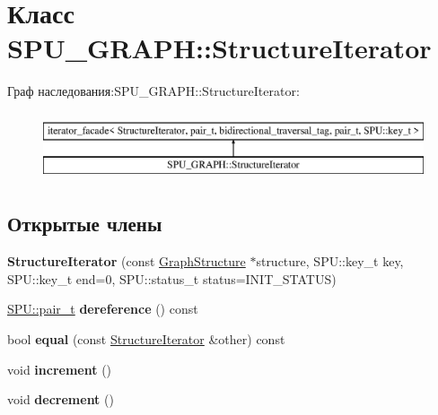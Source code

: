\hypertarget{class_s_p_u___g_r_a_p_h_1_1_structure_iterator}{}\section{Класс S\+P\+U\+\_\+\+G\+R\+A\+PH\+:\+:Structure\+Iterator}
\label{class_s_p_u___g_r_a_p_h_1_1_structure_iterator}
Граф наследования\+:S\+P\+U\+\_\+\+G\+R\+A\+PH\+:\+:Structure\+Iterator\+:\begin{figure}[H]
\begin{center}
\leavevmode
\includegraphics[height=2.000000cm]{class_s_p_u___g_r_a_p_h_1_1_structure_iterator}
\end{center}
\end{figure}
\subsection*{Открытые члены}
\begin{DoxyCompactItemize}
\item 
\mbox{\label{class_s_p_u___g_r_a_p_h_1_1_structure_iterator_a673249f944f5f9a2eb48e2de9cbda41e}} 
{\bfseries Structure\+Iterator} (const \hyperlink{class_s_p_u___g_r_a_p_h_1_1_graph_structure}{Graph\+Structure} $\ast$structure, S\+P\+U\+::key\+\_\+t key, S\+P\+U\+::key\+\_\+t end=0, S\+P\+U\+::status\+\_\+t status=I\+N\+I\+T\+\_\+\+S\+T\+A\+T\+US)
\item 
\mbox{\label{class_s_p_u___g_r_a_p_h_1_1_structure_iterator_a94c72b8aa9b86fdc9a6e2e5269c0be8f}} 
\hyperlink{struct_s_p_u_1_1pair__containter}{S\+P\+U\+::pair\+\_\+t} {\bfseries dereference} () const
\item 
\mbox{\label{class_s_p_u___g_r_a_p_h_1_1_structure_iterator_aec592dd9ddecca8f1fbd6bb7f3e523be}} 
bool {\bfseries equal} (const \hyperlink{class_s_p_u___g_r_a_p_h_1_1_structure_iterator}{Structure\+Iterator} \&other) const
\item 
\mbox{\label{class_s_p_u___g_r_a_p_h_1_1_structure_iterator_ae4947b8b245fbb27fa3a5398fe02de28}} 
void {\bfseries increment} ()
\item 
\mbox{\label{class_s_p_u___g_r_a_p_h_1_1_structure_iterator_a5ec155383d89c1e8b2a03d9b43a47414}} 
void {\bfseries decrement} ()
\end{DoxyCompactItemize}
